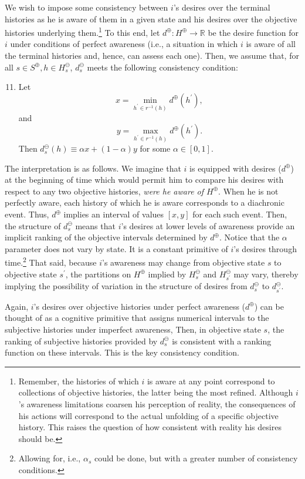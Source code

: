 \documentclass[
11pt,
titlepage,
reqno,
]{article}%
\theoremstyle{definition}
\begin{document}
We wish to impose some consistency between $i$'s desires over the terminal histories as he is aware of them in a given state and his desires over the objective histories underlying them.\footnote
{
	Remember, the histories of which $i$ is aware at any point correspond to collections of objective histories, the latter being the most refined. 
	Although $i$'s awareness limitations coarsen his perception of reality, the consequences of his actions will correspond to the actual unfolding of a specific objective history. 
	This raises the question of how consistent with reality his desires should be.
}
To this end, let $d^\oplus:H^\oplus\rightarrow \mathbb{R}$ be the desire function for $i$ under conditions of perfect awareness (i.e., a situation in which $i$ is aware of all the terminal histories and, hence, can assess each one).
Then, we assume that, for all $s\in S^\oplus,h\in H^\ominus_s$, $d^\ominus_s$ meets the following consistency condition:
\begin{enumerate}
	\setcounter{enumi}{10}
	\item Let 
	\[
		x=\min_{h^\prime\in r^{-1}(h)}d^\oplus(h^\prime),
	\]
	 and  
	 \[
	 	y=\max_{h^\prime\in r^{-1}(h)}d^\oplus(h^\prime).
	 \]
	 Then $d^\ominus_s(h)\equiv\alpha x + (1-\alpha)y$ for some $\alpha\in[0,1]$. 
\end{enumerate}
The interpretation is as follows. 
We imagine that $i$ is equipped with desires ($d^\oplus$) at the beginning of time which would permit him to compare his desires with respect to any two objective histories, \textit{were he aware of $H^\oplus$}.
When he is not perfectly aware, each history of which he is aware corresponds to a diachronic event.
Thus, $d^\oplus$ implies an interval of values $[x,y]$ for each such event.
Then, the structure of $d^\ominus_s$ means that $i$'s desires at lower levels of awareness provide an implicit ranking of the objective intervals determined by   $d^\oplus$.
Notice that the $\alpha$ parameter does not vary by state. 
It is a constant primitive of $i$'s desires through time.\footnote
{
	Allowing for, i.e., $\alpha_s$ could be done, but with a greater number of consistency conditions.
}
That said, because $i$'s awareness may change from objective state $s$ to objective state $s^\prime$, the partitions on $H^\oplus$ implied by $H^\ominus_s$ and $H^\ominus_{s^\prime}$ may vary, thereby implying the possibility of variation in the structure of desires from $d^\ominus_s$ to $d^\ominus_{s^\prime}$. 

Again, $i$'s desires over objective histories under perfect awareness ($d^\oplus$) can be thought of as a cognitive primitive that assigns numerical intervals to the subjective histories under imperfect awareness,
Then, in objective state $s$, the ranking of subjective histories provided by $d^\ominus_s$ is consistent with a ranking function on these intervals. 
This is the key consistency condition. 
\end{document}
